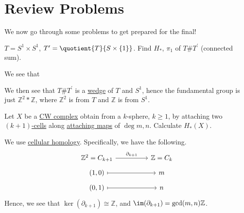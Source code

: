 \section{Review Problems}
We now go through some problems to get prepared for the final!
\begin{exercise}[QR May 2019]
	\(T = S^1 \times S^1\), \(T^\prime = \quotient{T}{S \times \{1\}} \). Find \(H_\ast\), \(\pi _1\) of \(T \# T^\prime \) (connected sum).
\end{exercise}
\begin{answer}
	We see that
	\begin{figure}[H]
		\centering
		\label{fig:ans:ex-1:lec-40}
	\end{figure}
	We then see that \(T\# T^\prime \) is a \hyperref[CW-complex-wedge-sum]{wedge} of \(T\) and \(S^1\), hence the fundamental group is just \(\mathbb{Z} ^{2} \ast \mathbb{Z} \), where \(\mathbb{Z} ^{2} \) is from \(T\) and \(\mathbb{Z} \)
	is from \(S^{1} \).
\end{answer}

\begin{exercise}[QR Aug. 2019]
	Let \(X\) be a \hyperref[def:CW-Complex]{CW complex} obtain from a \(k\)-sphere, \(k\geq 1\), by attaching two \hyperref[def:cell]{\((k+1)\)-cells} along \hyperref[def:attaching-map]{attaching maps} of \(\deg m, n\). Calculate \(H_\ast (X)\).
\end{exercise}
\begin{answer}
	We use \hyperref[def:cellular-homology-group]{cellular homology}. Specifically, we have the following.
	\[\begin{tikzcd}[row sep=tiny]
			{\mathbb{Z}^2=C_{k+1}} && {\mathbb{Z}=C_k} \\
			{(1, 0)} && m \\
			{(0, 1)} && n
			\arrow[maps to, from=2-1, to=2-3]
			\arrow[maps to, from=3-1, to=3-3]
			\arrow["{\partial_{k+1}}", from=1-1, to=1-3]
		\end{tikzcd}\]
	Hence, we see that \(\ker(\partial _{k+1}) \cong \mathbb{Z} \), and \(\im(\partial _{k+1}) = \gcd(m, n)\mathbb{Z} \).
\end{answer}

